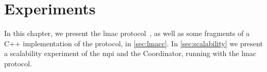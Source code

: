 \chapter{Experiments}\label{ch:experiments}
In this chapter, we present the \gls{lmac} protocol~\cite{paper:lmac_protocol}, as
well as some fragments of a C++ implementation of the protocol, in \autoref{sec:lmacc}. In
\autoref{sec:scalability} we present a scalability experiment of the \gls{mpi} and the Coordinator, running
with the \gls{lmac} protocol.


